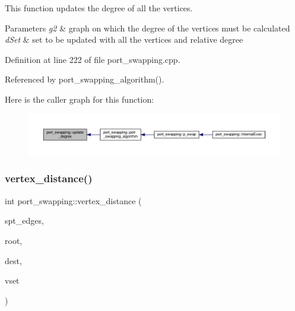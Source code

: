 This function updates the degree of all the vertices. 


\begin{DoxyParams}{Parameters}
{\em g2} & graph on which the degree of the vertices must be calculated \\
\hline
{\em d\+Set} & set to be updated with all the vertices and relative degree \\
\hline
\end{DoxyParams}


Definition at line 222 of file port\+\_\+swapping.\+cpp.



Referenced by port\+\_\+swapping\+\_\+algorithm().

Here is the caller graph for this function\+:
\nopagebreak
\begin{figure}[H]
\begin{center}
\leavevmode
\includegraphics[width=350pt]{d6/d83/classport__swapping_a7c205c3674a0352aa59355348a571579_icgraph}
\end{center}
\end{figure}
\mbox{\label{classport__swapping_a7d72da53b43df36ea443845622bbe5a2}} 
\subsubsection{\texorpdfstring{vertex\+\_\+distance()}{vertex\_distance()}}
{\footnotesize\ttfamily int port\+\_\+swapping\+::vertex\+\_\+distance (\begin{DoxyParamCaption}\item[{std\+::vector$<$ \hyperlink{classport__swapping_ac98b23b7c2dd3f3792327fb666489d66}{P\+SE} $>$ \&}]{spt\+\_\+edges,  }\item[{\hyperlink{classport__swapping_a9588366dd46f9f32aab2c8de93d5679f}{P\+S\+Vertex}}]{root,  }\item[{\hyperlink{classport__swapping_a9588366dd46f9f32aab2c8de93d5679f}{P\+S\+Vertex}}]{dest,  }\item[{std\+::vector$<$ \hyperlink{structport__swapping_1_1PSVSet}{P\+S\+V\+Set} $>$ \&}]{vset }\end{DoxyParamCaption})}




